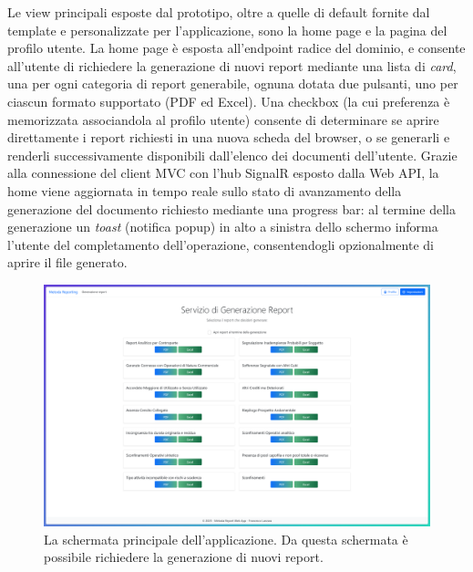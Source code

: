 Le view principali esposte dal prototipo, oltre a quelle di default fornite dal template e personalizzate per l'applicazione, sono la home page e la pagina del profilo utente.
La home page è esposta all'endpoint radice del dominio, e consente all'utente di richiedere la generazione di nuovi report mediante una lista di \emph{card}, una per ogni categoria di report generabile, ognuna dotata due pulsanti, uno per ciascun formato supportato (PDF ed Excel).
Una checkbox (la cui preferenza è memorizzata associandola al profilo utente) consente di determinare se aprire direttamente i report richiesti in una nuova scheda del browser, o se generarli e renderli successivamente disponibili dall'elenco dei documenti dell'utente. Grazie alla connessione del client MVC con l'hub SignalR esposto dalla Web API, la home viene aggiornata in tempo reale sullo stato di avanzamento della generazione del documento richiesto mediante una progress bar: al termine della generazione un \emph{toast} (notifica popup) in alto a sinistra dello schermo informa l'utente del completamento dell'operazione, consentendogli opzionalmente di aprire il file generato.

\begin{figure}[H]
        \centering
        \includegraphics[width=15.5cm]{fig/screen_home.png}
        \caption[Schermata home]{La schermata principale dell'applicazione. Da questa schermata è possibile richiedere la generazione di nuovi report.}
\end{figure}

